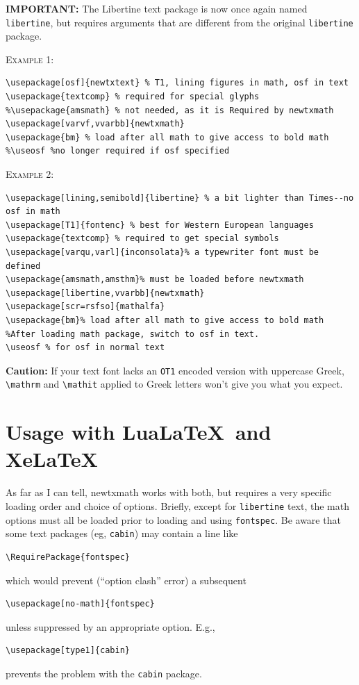 \documentclass[11pt]{article}
\theoremstyle{oldplain}
\theoremstyle{plain}
\begin{document}
\textbf{IMPORTANT:} The Libertine text package is now once again named {\tt libertine}, but requires arguments that are different from the original {\tt libertine} package.

\textsc{Example 1:}
\begin{verbatim}
\usepackage[osf]{newtxtext} % T1, lining figures in math, osf in text
\usepackage{textcomp} % required for special glyphs
%\usepackage{amsmath} % not needed, as it is Required by newtxmath
\usepackage[varvf,vvarbb]{newtxmath}
\usepackage{bm} % load after all math to give access to bold math
%\useosf %no longer required if osf specified
\end{verbatim}
\textsc{Example 2:}
\begin{verbatim}
\usepackage[lining,semibold]{libertine} % a bit lighter than Times--no osf in math
\usepackage[T1]{fontenc} % best for Western European languages
\usepackage{textcomp} % required to get special symbols
\usepackage[varqu,varl]{inconsolata}% a typewriter font must be defined
\usepackage{amsmath,amsthm}% must be loaded before newtxmath
\usepackage[libertine,vvarbb]{newtxmath}
\usepackage[scr=rsfso]{mathalfa}
\usepackage{bm}% load after all math to give access to bold math
%After loading math package, switch to osf in text.
\useosf % for osf in normal text
\end{verbatim}

\textbf{Caution:} If your text font lacks an {\tt OT1} encoded version with uppercase Greek, \verb|\mathrm| and \verb|\mathit| applied to Greek letters won't give you what you expect.
\section{Usage with Lua\LaTeX\ and Xe\LaTeX}
As far as I can tell, \textsf{newtxmath} works with both, but requires a very specific loading order and choice of options. Briefly, except for {\tt libertine} text, the math options must all be loaded prior to loading and using {\tt fontspec}. Be aware that some text packages (eg, {\tt cabin}) may contain a line like
\begin{verbatim}
\RequirePackage{fontspec}
\end{verbatim}
which would prevent (``option clash'' error) a subsequent 
\begin{verbatim}
\usepackage[no-math]{fontspec}
\end{verbatim}
unless suppressed by an appropriate option. E.g., 
\begin{verbatim}
\usepackage[type1]{cabin}
\end{verbatim}
prevents the problem with the {\tt cabin} package.
\end{document}

